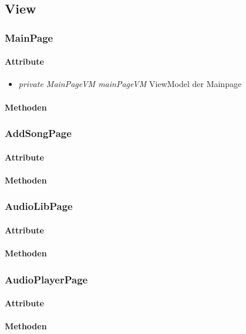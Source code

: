 \documentclass[../entwurf.tex]{subfiles}
\begin{document}
\newcommand{\attr}[1]{\item \textit{#1}}

\subsection{View}
\subsubsection{MainPage}
\paragraph{Attribute}
\begin{itemize}
	\attr{private MainPageVM mainPageVM} ViewModel der Mainpage
\end{itemize}
\paragraph{Methoden}
\subsubsection{AddSongPage}
\paragraph{Attribute}
\paragraph{Methoden}
\subsubsection{AudioLibPage}
\paragraph{Attribute}
\paragraph{Methoden}
\subsubsection{AudioPlayerPage}
\paragraph{Attribute}
\paragraph{Methoden}
\end{document}
